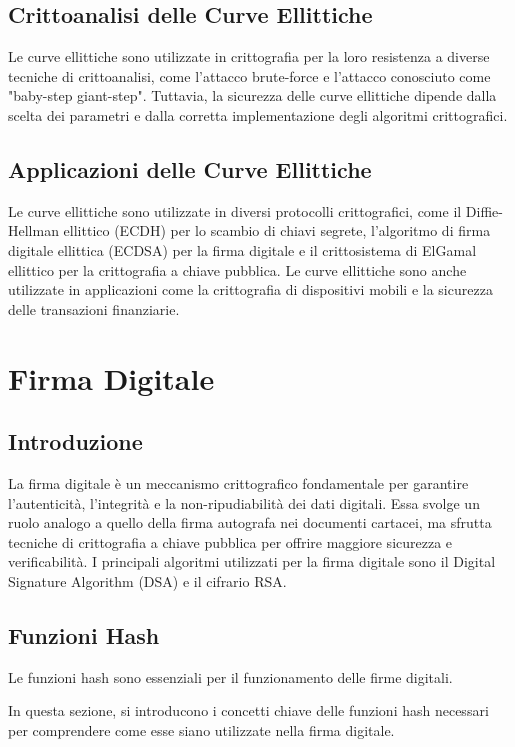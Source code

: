 \documentclass[a4paper,12pt]{report}
\begin{document}
\section{Crittoanalisi delle Curve Ellittiche}

Le curve ellittiche sono utilizzate in crittografia per la loro resistenza a diverse tecniche di crittoanalisi, come l'attacco brute-force e l'attacco conosciuto come "baby-step giant-step". Tuttavia, la sicurezza delle curve ellittiche dipende dalla scelta dei parametri e dalla corretta implementazione degli algoritmi crittografici.

\section{Applicazioni delle Curve Ellittiche}

Le curve ellittiche sono utilizzate in diversi protocolli crittografici, come il Diffie-Hellman ellittico (ECDH) per lo scambio di chiavi segrete, l'algoritmo di firma digitale ellittica (ECDSA) per la firma digitale e il crittosistema di ElGamal ellittico per la crittografia a chiave pubblica. Le curve ellittiche sono anche utilizzate in applicazioni come la crittografia di dispositivi mobili e la sicurezza delle transazioni finanziarie.

%
%
%
%
%
%
\chapter{Firma Digitale}

\section{Introduzione}
La firma digitale è un meccanismo crittografico fondamentale per garantire l'autenticità, l'integrità e la non-ripudiabilità dei dati digitali. Essa svolge un ruolo analogo a quello della firma autografa nei documenti cartacei, ma sfrutta tecniche di crittografia a chiave pubblica per offrire maggiore sicurezza e verificabilità. I principali algoritmi utilizzati per la firma digitale sono il Digital Signature Algorithm (DSA) e il cifrario RSA.
\section{Funzioni Hash}
Le funzioni hash sono essenziali per il funzionamento delle firme digitali.

In questa sezione, si introducono i concetti chiave delle funzioni hash necessari per comprendere come esse siano utilizzate nella firma digitale.
\end{document}
